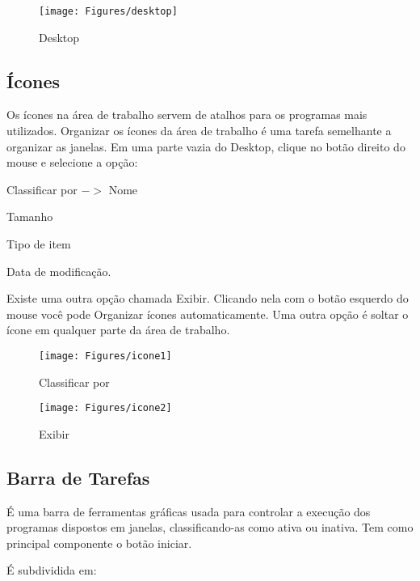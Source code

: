 \documentclass[12pt]{article}
\begin{document}
\begin{figure}[!hb]
	\centering
	\texttt{[image: Figures/desktop]}
	\caption{Desktop}
	\label{fig:desktop}
\end{figure}


\subsection{Ícones}
	Os ícones na área de trabalho servem de atalhos para os programas mais utilizados.	
	Organizar os ícones da área de trabalho é uma tarefa semelhante a organizar as janelas. Em uma parte vazia do Desktop, clique no botão direito do mouse e selecione a opção: 

	Classificar por $->$ Nome
	
	 \hspace{3.6cm}Tamanho
	 
	 \hspace{3.6cm}Tipo de item
	 
	 \hspace{3.6cm}Data de modificação.
	
	 Existe uma outra opção chamada Exibir. Clicando nela com o botão esquerdo do mouse você pode Organizar ícones automaticamente. Uma outra opção é soltar o ícone em qualquer parte da área de trabalho.
	
	
	\begin{figure}[!htbp]
		\centering
		\begin{minipage}[b]{0.45\textwidth}
			\texttt{[image: Figures/icone1]}
			\caption{Classificar por}
			\label{fig:classificar por}
		\end{minipage}
		\hfill
		\begin{minipage}[b]{0.45\textwidth}
			\texttt{[image: Figures/icone2]}
			\caption{Exibir}
			\label{fig:exibir}
		\end{minipage}
	\end{figure}

\subsection{Barra de Tarefas}

	É uma barra de ferramentas gráficas usada para controlar a execução dos programas dispostos em janelas, classificando-as como ativa ou inativa. Tem como principal componente o botão iniciar.
	
	É subdividida em:
	
\end{document}
